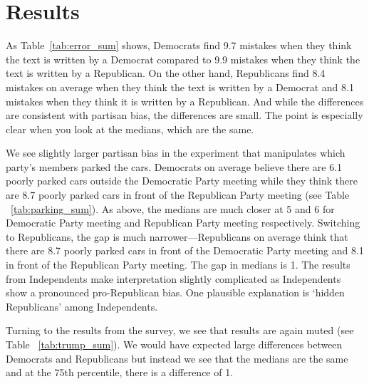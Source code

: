 \documentclass[12pt, letterpaper]{article}
\begin{document}
\section{Results}

As Table~\ref{tab:error_sum} shows, Democrats find 9.7 mistakes when they think the text is written by a Democrat compared to 9.9 mistakes when they think the text is written by a Republican. On the other hand, Republicans find 8.4 mistakes on average when they think the text is written by a Democrat and 8.1 mistakes when they think it is written by a Republican. And while the differences are consistent with partisan bias, the differences are small. The point is especially clear when you look at the medians, which are the same.



We see slightly larger partisan bias in the experiment that manipulates which party's members parked the cars. Democrats on average believe there are 6.1 poorly parked cars outside the Democratic Party meeting while they think there are 8.7 poorly parked cars in front of the Republican Party meeting (see Table ~\ref{tab:parking_sum}). As above, the medians are much closer at 5 and 6 for Democratic Party meeting and Republican Party meeting respectively. Switching to Republicans, the gap is much narrower---Republicans on average think that there are 8.7 poorly parked cars in front of the Democratic Party meeting and 8.1 in front of the Republican Party meeting. The gap in medians is 1. The results from Independents make interpretation slightly complicated as Independents show a pronounced pro-Republican bias. One plausible explanation is `hidden Republicans' among Independents.



Turning to the results from the survey, we see that results are again muted (see Table ~\ref{tab:trump_sum}). We would have expected large differences between Democrats and Republicans but instead we see that the medians are the same and at the 75th percentile, there is a difference of 1.



\clearpage


\clearpage


\appendix
\renewcommand{\thesection}{SI \arabic{section}}
\setcounter{table}{0}\renewcommand\thetable{\thesection.\arabic{table}}  
\setcounter{figure}{0}\renewcommand\thefigure{\thesection.\arabic{figure}}
\end{document}
